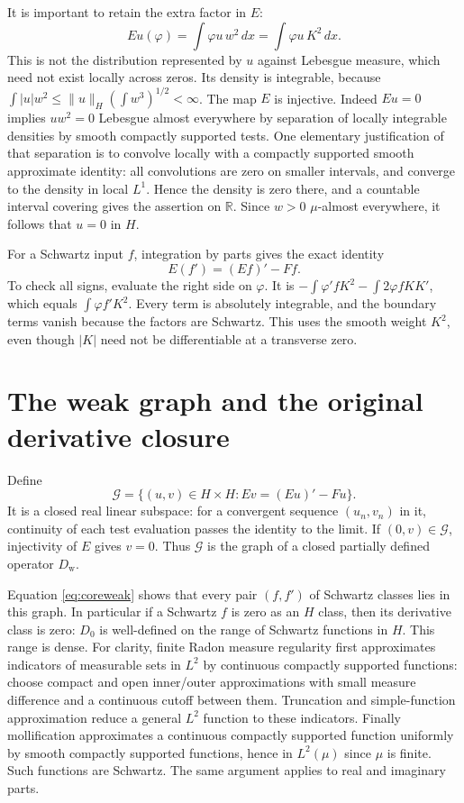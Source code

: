 \documentclass[11pt]{article}
\newcommand{\R}{\mathbb R}\newcommand{\C}{\mathbb C}
\begin{document}
It is important to retain the extra factor in $E$:
\begin{equation}\label{eq:weightsquared}
 Eu(\varphi)=\int\varphi u\,w^2\,dx
             =\int\varphi u\,K^2\,dx.
\end{equation}
This is not the distribution represented by $u$ against Lebesgue
measure, which need not exist locally across zeros. Its density
is integrable, because
$\int|u|w^2\leq\|u\|_H(\int w^3)^{1/2}<\infty$.
The map $E$ is injective. Indeed $Eu=0$ implies $u w^2=0$
Lebesgue almost everywhere by separation of locally integrable
densities by smooth compactly supported tests. One elementary
justification of that separation is to convolve locally with a
compactly supported smooth approximate identity: all convolutions
are zero on smaller intervals, and converge to the density in
local $L^1$. Hence the density is zero there, and a countable
interval covering gives the assertion on $\R$. Since $w>0$
$\mu$-almost everywhere, it follows that $u=0$ in $H$.

For a Schwartz input $f$, integration by parts gives the exact
identity
\begin{equation}\label{eq:coreweak}
 E(f')=(Ef)'-Ff.
\end{equation}
To check all signs, evaluate the right side on $\varphi$. It is
$-\int\varphi'fK^2-\int2\varphi fKK'$, which equals
$\int\varphi f'K^2$. Every term is absolutely integrable, and
the boundary terms vanish because the factors are Schwartz.
This uses the smooth weight $K^2$, even though $|K|$ need not
be differentiable at a transverse zero.

\section{The weak graph and the original derivative closure}
Define
\begin{equation}\label{eq:weakgraph}
 \mathcal G=\{(u,v)\in H\times H:Ev=(Eu)'-Fu\}.
\end{equation}
It is a closed real linear subspace: for a convergent sequence
$(u_n,v_n)$ in it, continuity of each test evaluation passes the
identity to the limit. If $(0,v)\in\mathcal G$, injectivity of
$E$ gives $v=0$. Thus $\mathcal G$ is the graph of a closed
partially defined operator $D_{\mathrm w}$.

Equation \eqref{eq:coreweak} shows that every pair $(f,f')$ of
Schwartz classes lies in this graph. In particular if a Schwartz
$f$ is zero as an $H$ class, then its derivative class is zero:
$D_0$ is well-defined on the range of Schwartz functions in $H$.
This range is dense. For clarity, finite Radon measure regularity
first approximates indicators of measurable sets in $L^2$ by
continuous compactly supported functions: choose compact and open
inner/outer approximations with small measure difference and a
continuous cutoff between them. Truncation and simple-function
approximation reduce a general $L^2$ function to these indicators.
Finally mollification approximates a continuous compactly supported
function uniformly by smooth compactly supported functions, hence
in $L^2(\mu)$ since $\mu$ is finite. Such functions are Schwartz.
The same argument applies to real and imaginary parts.
\end{document}
